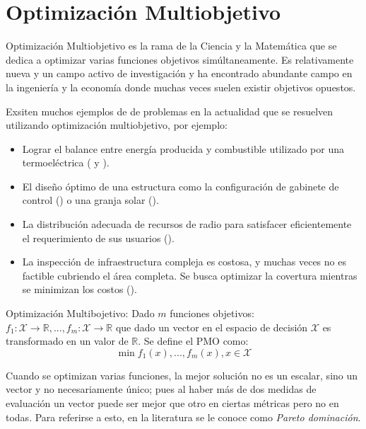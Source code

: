 \section{Optimizaci\'on Multiobjetivo}\label{proposal:moo}
Optimizaci\'on Multiobjetivo es la rama de la Ciencia y la Matem\'atica que se dedica a optimizar varias funciones objetivos sim\'ultaneamente. Es relativamente nueva y un campo activo de investigaci\'on y ha encontrado abundante campo en la ingenier\'ia y la econom\'ia donde muchas veces suelen existir objetivos opuestos. 

Exsiten muchos ejemplos de de problemas en la actualidad que se resuelven utilizando optimizaci\'on multiobjetivo, por ejemplo:
\begin{itemize}
    \item Lograr el balance entre energ\'ia producida y combustible utilizado por una termoel\'ectrica (\cite{shirazi2012thermal} y \cite{shirazi2014thermal}).
    \item El dise\~no \'optimo de una estructura como la configuraci\'on de gabinete de control (\cite{pllana2019customizing}) o una granja solar (\cite{ganesan2013hypervolume}).
    \item La distribuci\'on adecuada de recursos de radio para satisfacer eficientemente el requerimiento de sus usuarios (\cite{bjornson2013optimal}).
    \item La inspecci\'on de infraestructura compleja es costosa, y muchas veces no es factible cubriendo el \'area completa. Se busca optimizar la covertura mientras se minimizan los costos (\cite{ellefsen2017multiobjective}).
\end{itemize}

\begin{definition}{Optimizaci\'on Multibojetivo:}
     Dado $m$ funciones objetivos: $f_1: \mathcal{X} \rightarrow \mathbb{R}, ..., f_m: \mathcal{X} \rightarrow \mathbb{R}$ que dado un vector en el espacio de decisi\'on $\mathcal{X}$ es transformado en un valor de $\mathbb{R}$. Se define el PMO como:
    \begin{equation*}
        \min f_1(x), ..., f_m(x), x \in \mathcal{X}
    \end{equation*}
\end{definition}

Cuando se optimizan varias funciones, la mejor soluci\'on  no es un escalar, sino un vector y no necesariamente \'unico; pues al haber m\'as de dos medidas de evaluaci\'on un vector puede ser mejor que otro en ciertas m\'etricas pero no en todas. Para referirse a esto, en la literatura se le conoce como \textit{Pareto dominaci\'on}.

